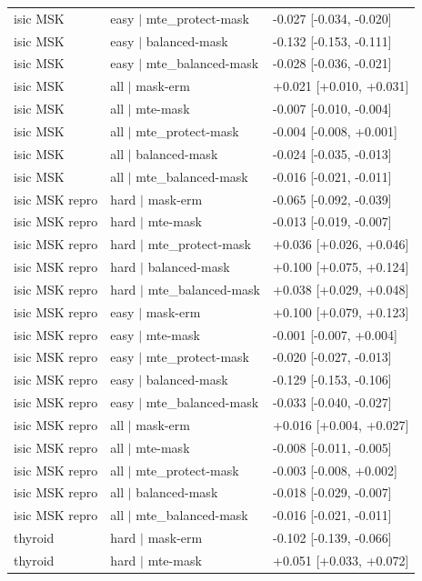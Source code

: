 \begin{table}[H]
\begin{tabular}{lll}
isic MSK & easy $|$ mte\_protect-mask & -0.027 [-0.034, -0.020] \\
isic MSK & easy $|$ balanced-mask & -0.132 [-0.153, -0.111] \\
isic MSK & easy $|$ mte\_balanced-mask & -0.028 [-0.036, -0.021] \\
isic MSK & all $|$ mask-erm & +0.021 [+0.010, +0.031] \\
isic MSK & all $|$ mte-mask & -0.007 [-0.010, -0.004] \\
isic MSK & all $|$ mte\_protect-mask & -0.004 [-0.008, +0.001] \\
isic MSK & all $|$ balanced-mask & -0.024 [-0.035, -0.013] \\
isic MSK & all $|$ mte\_balanced-mask & -0.016 [-0.021, -0.011] \\
isic MSK repro & hard $|$ mask-erm & -0.065 [-0.092, -0.039] \\
isic MSK repro & hard $|$ mte-mask & -0.013 [-0.019, -0.007] \\
isic MSK repro & hard $|$ mte\_protect-mask & +0.036 [+0.026, +0.046] \\
isic MSK repro & hard $|$ balanced-mask & +0.100 [+0.075, +0.124] \\
isic MSK repro & hard $|$ mte\_balanced-mask & +0.038 [+0.029, +0.048] \\
isic MSK repro & easy $|$ mask-erm & +0.100 [+0.079, +0.123] \\
isic MSK repro & easy $|$ mte-mask & -0.001 [-0.007, +0.004] \\
isic MSK repro & easy $|$ mte\_protect-mask & -0.020 [-0.027, -0.013] \\
isic MSK repro & easy $|$ balanced-mask & -0.129 [-0.153, -0.106] \\
isic MSK repro & easy $|$ mte\_balanced-mask & -0.033 [-0.040, -0.027] \\
isic MSK repro & all $|$ mask-erm & +0.016 [+0.004, +0.027] \\
isic MSK repro & all $|$ mte-mask & -0.008 [-0.011, -0.005] \\
isic MSK repro & all $|$ mte\_protect-mask & -0.003 [-0.008, +0.002] \\
isic MSK repro & all $|$ balanced-mask & -0.018 [-0.029, -0.007] \\
isic MSK repro & all $|$ mte\_balanced-mask & -0.016 [-0.021, -0.011] \\
thyroid & hard $|$ mask-erm & -0.102 [-0.139, -0.066] \\
thyroid & hard $|$ mte-mask & +0.051 [+0.033, +0.072] \\

\end{tabular}
\end{table}
